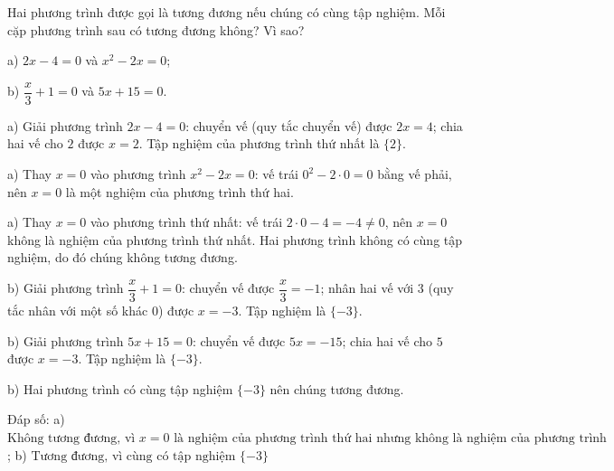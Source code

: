 \begin{problem}[8DS-PT1-024]
Hai phương trình được gọi là tương đương nếu chúng có cùng tập nghiệm. Mỗi cặp phương trình sau có tương đương không? Vì sao?

a) $2x - 4 = 0$ và $x^2 - 2x = 0$;

b) $\dfrac{x}{3} + 1 = 0$ và $5x + 15 = 0$.

\begin{solution}
a) Giải phương trình $2x - 4 = 0$: chuyển vế (quy tắc chuyển vế) được $2x = 4$; chia hai vế cho $2$ được $x = 2$. Tập nghiệm của phương trình thứ nhất là $\{2\}$.

a) Thay $x = 0$ vào phương trình $x^2 - 2x = 0$: vế trái $0^2 - 2 \cdot 0 = 0$ bằng vế phải, nên $x = 0$ là một nghiệm của phương trình thứ hai.

a) Thay $x = 0$ vào phương trình thứ nhất: vế trái $2 \cdot 0 - 4 = -4 \neq 0$, nên $x = 0$ không là nghiệm của phương trình thứ nhất. Hai phương trình không có cùng tập nghiệm, do đó chúng không tương đương.

b) Giải phương trình $\dfrac{x}{3} + 1 = 0$: chuyển vế được $\dfrac{x}{3} = -1$; nhân hai vế với $3$ (quy tắc nhân với một số khác $0$) được $x = -3$. Tập nghiệm là $\{-3\}$.

b) Giải phương trình $5x + 15 = 0$: chuyển vế được $5x = -15$; chia hai vế cho $5$ được $x = -3$. Tập nghiệm là $\{-3\}$.

b) Hai phương trình có cùng tập nghiệm $\{-3\}$ nên chúng tương đương.

Đáp số: a) $\boxed{\text{Không tương đương, vì } x = 0 \text{ là nghiệm của phương trình thứ hai nhưng không là nghiệm của phương trình thứ nhất}}$; b) $\boxed{\text{Tương đương, vì cùng có tập nghiệm } \{-3\}}$
\end{solution}
\end{problem}

